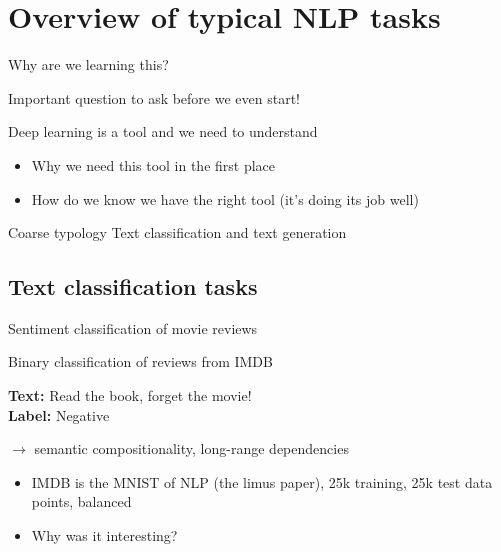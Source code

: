\documentclass[12pt,aspectratio=169,handout]{beamer}
\begin{document}
\section{Overview of typical NLP tasks}


\begin{frame}{Why are we learning this?}
	
Important question to ask before we even start!

\bigskip

Deep learning is a tool and we need to understand

\begin{itemize}
	\item Why we need this tool in the first place
	\item How do we know we have the right tool (it's doing its job well)
\end{itemize}


\end{frame}


\begin{frame}{Coarse typology}
Text classification and text generation
\end{frame}

\subsection{Text classification tasks}

\begin{frame}{ Sentiment classification of movie reviews}

Binary classification of reviews from IMDB

\begin{example}
	\textbf{Text:} Read the book, forget the movie! \\
	\textbf{Label:} Negative
\end{example}	

$\to$ semantic compositionality, long-range dependencies


\begin{itemize}
\item IMDB is the MNIST of NLP (the limus paper), 25k training, 25k test data points, balanced
\item Why was it interesting?
\end{itemize}

\end{frame}
\end{document}
